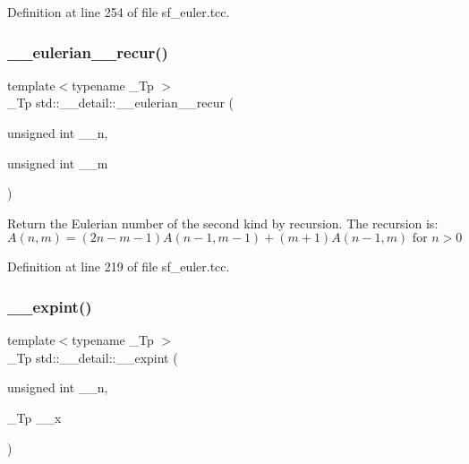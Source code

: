Definition at line 254 of file sf\+\_\+euler.\+tcc.

\mbox{\label{namespacestd_1_1____detail_a8a2a09c66c530759ae98ac1f3c1d93e5}} 
\subsubsection{\texorpdfstring{\+\_\+\+\_\+eulerian\+\_\+\_\+recur()}{\_\_eulerian\_2\_recur()}}
{\footnotesize\ttfamily template$<$typename \+\_\+\+Tp $>$ \\
\+\_\+\+Tp std\+::\+\_\+\+\_\+detail\+::\+\_\+\+\_\+eulerian\+\_\+\_\+recur (\begin{DoxyParamCaption}\item[{unsigned int}]{\+\_\+\+\_\+n,  }\item[{unsigned int}]{\+\_\+\+\_\+m }\end{DoxyParamCaption})}

Return the Eulerian number of the second kind by recursion. The recursion is\+: \[ A(n,m) = (2n-m-1)A(n-1,m-1) + (m+1)A(n-1,m) \mbox{ for } n > 0 \] 

Definition at line 219 of file sf\+\_\+euler.\+tcc.

\mbox{\label{namespacestd_1_1____detail_a0282700710ec07b8ca095fe2ec140d6e}} 
\subsubsection{\texorpdfstring{\+\_\+\+\_\+expint()}{\_\_expint()}\hspace{0.1cm}{\footnotesize\ttfamily [1/2]}}
{\footnotesize\ttfamily template$<$typename \+\_\+\+Tp $>$ \\
\+\_\+\+Tp std\+::\+\_\+\+\_\+detail\+::\+\_\+\+\_\+expint (\begin{DoxyParamCaption}\item[{unsigned int}]{\+\_\+\+\_\+n,  }\item[{\+\_\+\+Tp}]{\+\_\+\+\_\+x }\end{DoxyParamCaption})}



